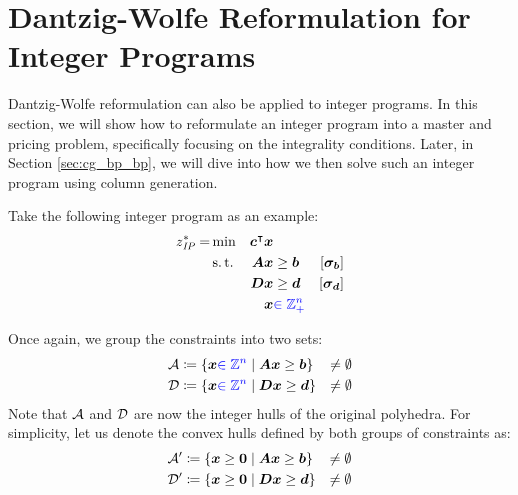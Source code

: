 \section{Dantzig-Wolfe Reformulation for Integer Programs}\label{sec:cg_bp_ip}
Dantzig-Wolfe reformulation can also be applied to integer programs. In this section, we will show how to reformulate an integer program into a master and pricing problem, specifically focusing on the integrality conditions. Later, in Section \ref{sec:cg_bp_bp}, we will dive into how we then solve such an integer program using column generation.

Take the following integer program as an example:
\begin{equation}
\begin{aligned}
z^*_{\textit{IP}}{} = &\min & {\bm{c}}^\intercal {\bm{x}} & & & \\
&\operatorname{s.t.} & {\bm{A}} {\bm{x}} & \geq {\bm{b}} & \left[{\bm{\sigma}}_{\bm{b}}\right] & \\
&& {\bm{D}} {\bm{x}} & \geq {\bm{d}} & \left[{\bm{\sigma}}_{\bm{d}}\right] & \\
&& {\bm{x}} & {\color{blue} \in \mathbb{Z}_ +^n}
\end{aligned}
\end{equation}

Once again, we group the constraints into two sets:
\begin{equation}
\begin{aligned}
\mathcal{A} &\coloneqq \left\{ {\bm{x}} {\color{blue} \in \mathbb{Z}^n} \mid {\bm{A}} {\bm{x}} \geq {\bm{b}} \right\} &\neq \emptyset \\
\mathcal{D} &\coloneqq \left\{ {\bm{x}} {\color{blue} \in \mathbb{Z}^n} \mid {\bm{D}} {\bm{x}} \geq {\bm{d}} \right\} &\neq \emptyset
\end{aligned}
\end{equation}
Note that $\mathcal{A}$ and $\mathcal{D}$ are now the integer hulls of the original polyhedra. For simplicity, let us denote the convex hulls defined by both groups of constraints as:
\begin{equation}
\begin{aligned}
\mathcal{A}' &\coloneqq \left\{ {\bm{x}} \geq {\bm{0}} \mid {\bm{A}} {\bm{x}} \geq {\bm{b}} \right\} &\neq \emptyset \\
\mathcal{D}' &\coloneqq \left\{ {\bm{x}} \geq {\bm{0}} \mid {\bm{D}} {\bm{x}} \geq {\bm{d}} \right\} &\neq \emptyset
\end{aligned}
\end{equation}

